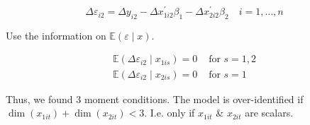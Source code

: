 {{$$
\Delta \varepsilon_{i 2}=\Delta y_{i 2}-\Delta x_{1i2}^{\prime} \beta_{1}-\Delta x_{2i2}^{\prime} \beta_{2} \quad i=1, \dots, n
$$

Use the information on $\mathbb{E}(\varepsilon \mid x)$.

$$
\begin{array}{ll}
\mathbb{E}\left(\Delta \varepsilon_{i 2} \mid x_{1is}\right)=0 & \text { for } s=1,2 \\
\mathbb{E}\left(\Delta \varepsilon_{i 2} \mid x_{2is}\right)=0 & \text { for } s=1
\end{array}
$$

Thus, we found 3 moment conditions. The model is over-identified if $\operatorname{dim}\left(x_{1 i t}\right)+\operatorname{dim}\left(x_{2 i t}\right)<3$. I.e. only if $x_{1it}$ \& $x_{2it}$ are scalars.
}
}
